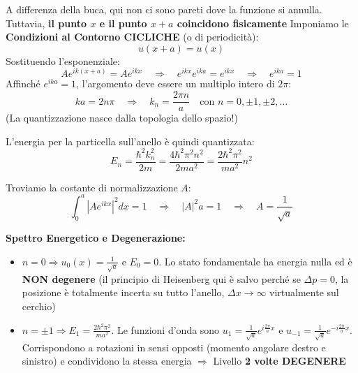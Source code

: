 \documentclass[11pt, a4paper]{article}
\begin{document}
A differenza della buca, qui non ci sono pareti dove la funzione si annulla. Tuttavia, \textbf{il punto $x$ e il punto $x+a$ coincidono fisicamente} %
Imponiamo le \textbf{Condizioni al Contorno CICLICHE} (o di periodicità): %
\begin{equation*}
    u(x+a) = u(x) %
\end{equation*}
Sostituendo l'esponenziale: %
\begin{equation*}
    A e^{ik(x+a)} = A e^{ikx} \quad \Rightarrow \quad e^{ikx} e^{ika} = e^{ikx} \quad \Rightarrow \quad e^{ika} = 1 %
\end{equation*}
Affinché $e^{ika} = 1$, l'argomento deve essere un multiplo intero di $2\pi$: %
\begin{equation}
    k a = 2n\pi \quad \Rightarrow \quad \boxed{ k_n = \frac{2\pi n}{a} } \quad \text{con } n = 0, \pm 1, \pm 2, \dots %
\end{equation}
(La quantizzazione nasce dalla topologia dello spazio!)

L'energia per la particella sull'anello è quindi quantizzata: %
\begin{equation}
    \boxed{ E_n = \frac{\hbar^2 k_n^2}{2m} = \frac{4 \hbar^2 \pi^2 n^2}{2 m a^2} = \frac{2 \hbar^2 \pi^2}{m a^2} n^2 } %
\end{equation}

Troviamo la costante di normalizzazione $A$: %
\begin{equation*}
    \int_0^a |A e^{ikx}|^2 dx = 1 \quad \Rightarrow \quad |A|^2 a = 1 \quad \Rightarrow \quad A = \frac{1}{\sqrt{a}} %
\end{equation*}

\noindent
\textbf{Spettro Energetico e Degenerazione:} %
\begin{itemize}
    \item $n = 0 \Rightarrow u_0(x) = \frac{1}{\sqrt{a}}$ e $E_0 = 0$. Lo stato fondamentale ha energia nulla ed è \textbf{NON degenere} (il principio di Heisenberg qui è salvo perché se $\Delta p = 0$, la posizione è totalmente incerta su tutto l'anello, $\Delta x \to \infty$ virtualmente sul cerchio) %
    \item $n = \pm 1 \Rightarrow E_1 = \frac{2 \hbar^2 \pi^2}{m a^2}$. Le funzioni d'onda sono $u_1 = \frac{1}{\sqrt{a}} e^{i\frac{2\pi}{a}x}$ e $u_{-1} = \frac{1}{\sqrt{a}} e^{-i\frac{2\pi}{a}x}$. Corrispondono a rotazioni in sensi opposti (momento angolare destro e sinistro) e condividono la stessa energia $\Rightarrow$ Livello \textbf{2 volte DEGENERE} %
\end{itemize}
\end{document}
